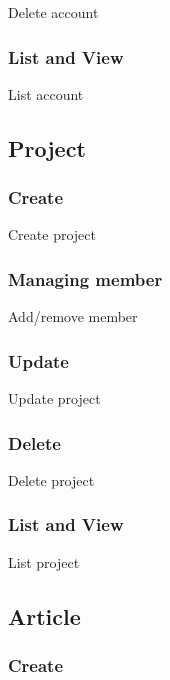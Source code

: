 Delete account

\subsubsection{List and View}
\label{ch:result:user_guide:account:list}

List account

\subsection{Project}
\label{ch:result:user_guide:project}
\subsubsection{Create}
\label{ch:result:user_guide:project:create}

Create project

\subsubsection{Managing member}
\label{ch:result:user_guide:project:managing_member}

Add/remove member

\subsubsection{Update}
\label{ch:result:user_guide:project:update}

Update project

\subsubsection{Delete}
\label{ch:result:user_guide:project:delete}

Delete project

\subsubsection{List and View}
\label{ch:result:user_guide:project:list}

List project

\subsection{Article}
\label{ch:result:user_guide:article}
\subsubsection{Create}
\label{ch:result:user_guide:article:create}

